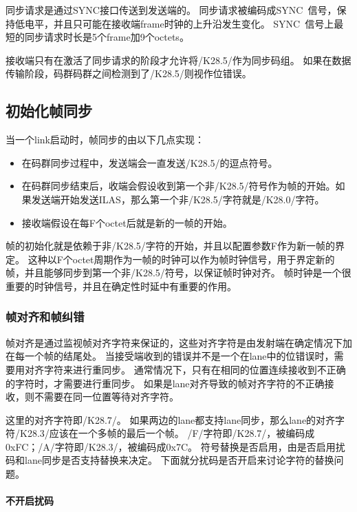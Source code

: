 \documentclass[UTF8]{ctexart}
\begin{document}
同步请求是通过SYNC接口传送到发送端的。
同步请求被编码成SYNC~信号，保持低电平，并且只可能在接收端frame时钟的上升沿发生变化。
SYNC~信号上最短的同步请求时长是5个frame加9个octets。

接收端只有在激活了同步请求的阶段才允许将/K28.5/作为同步码组。
如果在数据传输阶段，码群码群之间检测到了/K28.5/则视作位错误。

\subsection{初始化帧同步}

当一个link启动时，帧同步的由以下几点实现：

\begin{itemize}
  \item 在码群同步过程中，发送端会一直发送/K28.5/的逗点符号。
  \item 在码群同步结束后，收端会假设收到第一个非/K28.5/符号作为帧的开始。如果发送端开始发送ILAS，那么第一个非/K28.5/字符就是/K28.0/字符。
  \item 接收端假设在每F个octet后就是新的一帧的开始。
\end{itemize}

帧的初始化就是依赖于非/K28.5/字符的开始，并且以配置参数F作为新一帧的界定。
这种以F个octet周期作为一帧的时钟可以作为帧时钟信号，用于界定新的帧，并且能够同步到第一个非/K28.5/符号，以保证帧时钟对齐。
帧时钟是一个很重要的时钟信号，并且在确定性时延中有重要的作用。

\subsubsection{帧对齐和帧纠错}

帧对齐是通过监视帧对齐字符来保证的，这些对齐字符是由发射端在确定情况下加在每一个帧的结尾处。
当接受端收到的错误并不是一个在lane中的位错误时，需要用对齐字符来进行重同步。
通常情况下，只有在相同的位置连续接收到不正确的字符时，才需要进行重同步。
如果是lane对齐导致的帧对齐字符的不正确接收，则不需要在同一位置等待对齐字符。

这里的对齐字符即/K28.7/。
如果两边的lane都支持lane同步，那么lane的对齐字符/K28.3/应该在一个多帧的最后一个帧。
/F/字符即/K28.7/，被编码成0xFC；/A/字符即/K28.3/，被编码成0x7C。
符号替换是否启用，由是否启用扰码和lane同步是否支持替换来决定。
下面就分扰码是否开启来讨论字符的替换问题。

\paragraph{不开启扰码}
\end{document}
